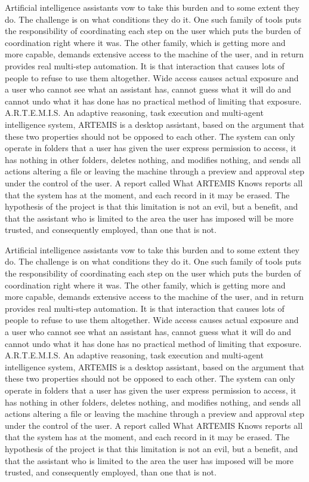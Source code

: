 \documentclass{FastFyp}
\begin{document}
Artificial intelligence assistants vow to take this burden and to some extent they do. The challenge is on what conditions they do it. One such family of tools puts the responsibility of coordinating each step on the user which puts the burden of coordination right where it was. The other family, which is getting more and more capable, demands extensive access to the machine of the user, and in return provides real multi-step automation. It is that interaction that causes lots of people to refuse to use them altogether. Wide access causes actual exposure and a user who cannot see what an assistant has, cannot guess what it will do and cannot undo what it has done has no practical method of limiting that exposure. A.R.T.E.M.I.S. An adaptive reasoning, task execution and multi-agent intelligence system, ARTEMIS is a desktop assistant, based on the argument that these two properties should not be opposed to each other. The system can only operate in folders that a user has given the user express permission to access, it has nothing in other folders, deletes nothing, and modifies nothing, and sends all actions altering a file or leaving the machine through a preview and approval step under the control of the user. A report called What ARTEMIS Knows reports all that the system has at the moment, and each record in it may be erased. The hypothesis of the project is that this limitation is not an evil, but a benefit, and that the assistant who is limited to the area the user has imposed will be more trusted, and consequently employed, than one that is not.

Artificial intelligence assistants vow to take this burden and to some extent they do. The challenge is on what conditions they do it. One such family of tools puts the responsibility of coordinating each step on the user which puts the burden of coordination right where it was. The other family, which is getting more and more capable, demands extensive access to the machine of the user, and in return provides real multi-step automation. It is that interaction that causes lots of people to refuse to use them altogether. Wide access causes actual exposure and a user who cannot see what an assistant has, cannot guess what it will do and cannot undo what it has done has no practical method of limiting that exposure. A.R.T.E.M.I.S. An adaptive reasoning, task execution and multi-agent intelligence system, ARTEMIS is a desktop assistant, based on the argument that these two properties should not be opposed to each other. The system can only operate in folders that a user has given the user express permission to access, it has nothing in other folders, deletes nothing, and modifies nothing, and sends all actions altering a file or leaving the machine through a preview and approval step under the control of the user. A report called What ARTEMIS Knows reports all that the system has at the moment, and each record in it may be erased. The hypothesis of the project is that this limitation is not an evil, but a benefit, and that the assistant who is limited to the area the user has imposed will be more trusted, and consequently employed, than one that is not.
\end{document}
